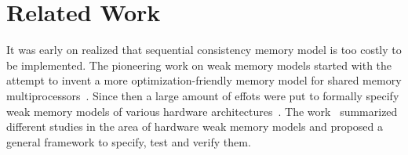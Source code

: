 \documentclass[a4paper,twoside,11pt]{article}
\numberwithin{equation}{section}
\begin{document}





\section{Related Work}




It was early on realized that sequential consistency memory model is too costly to be implemented. 
The pioneering work on weak memory models started with the attempt to 
invent a more optimization-friendly memory model 
for shared memory multiprocessors~\cite{Adve:PhD93, Adve:Comp96}.
Since then a large amount of effots were put to formally specify weak memory models of various 
hardware architectures~\cite{Chong-ASPLOS08, Alglave-DAMP09, Sewell-al:CACM10, Sarkar-al:PLDI11, Flur-al:POPL16}.
The work~\cite{Alglave-al:TOPLAS14} summarized different studies in the area 
of hardware weak memory models and proposed a general 
framework to specify, test and verify them.
\end{document}

